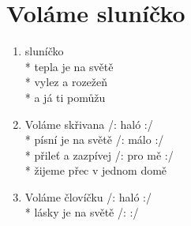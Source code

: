 \section{Voláme sluníčko}
\begin{enumerate}
\item {} sluníčko   \\*
tepla je na světě   \\*
vylez a rozežeň   \\*
a já ti pomůžu    
\item Voláme skřivana /: haló :/ \\*
písní je na světě /: málo :/ \\*
přileť a zazpívej /: pro mě :/ \\*
žijeme přec v jednom domě 
\item Voláme človíčku /: haló :/ \\*
lásky je na světě /:    :/ 
\end{enumerate}
